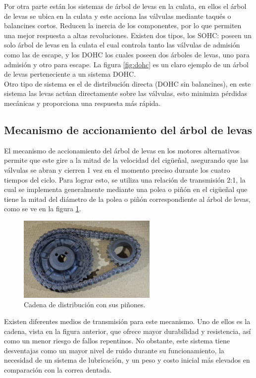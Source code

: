 Por otra parte están los sistemas de árbol de levas en la culata, en ellos el árbol de levas se ubica en la culata y este acciona las válvulas mediante taqués o balancines cortos. Reducen la inercia de los componentes, por lo que permiten una mejor respuesta a altas revoluciones. Existen dos tipos, los SOHC: poseen un solo árbol de levas en la culata el cual controla tanto las válvulas de admisión como las de escape, y los DOHC los cuales poseen dos árboles de levas, uno para admisión y otro para escape. La figura \ref{fig:dohc} es un claro ejemplo de un árbol de levas perteneciente a un sistema DOHC.\\

Otro tipo de sistema es el de distribución directa (DOHC sin balancines), en este sistema las levas actúan directamente sobre las válvulas, esto minimiza pérdidas mecánicas y proporciona una respuesta más rápida.

\subsection{Mecanismo de accionamiento del árbol de levas} \label{ss:camshaftchain}

El mecanismo de accionamiento del árbol de levas en los motores alternativos permite que este gire a la mitad de la velocidad del cigüeñal, asegurando que las válvulas se abran y cierren 1 vez en el momento preciso durante los cuatro tiempos del ciclo. Para lograr esto, se utiliza una relación de transmisión 2:1, la cual se implementa generalmente mediante una polea o piñón en el cigüeñal que tiene la mitad del diámetro de la polea o piñón correspondiente al árbol de levas, como se ve en la figura \ref{fig:chain}.

\begin{figure}[H]
	\centering
	\includegraphics[width=0.6\textwidth]{Figures/01/m2/dist_chain.jpg}
	\caption{Cadena de distribución con sus piñones.}
	\label{fig:chain}
\end{figure}

Existen diferentes medios de transmisión para este mecanismo. Uno de ellos es la cadena, vista en la figura anterior, que ofrece mayor durabilidad y resistencia, así como un menor riesgo de fallos repentinos. No obstante, este sistema tiene desventajas como un mayor nivel de ruido durante su funcionamiento, la necesidad de un sistema de lubricación, y un peso y costo inicial más elevados en comparación con la correa dentada.

